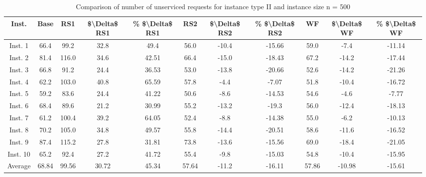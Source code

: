\begin{table}[H]
\centering
\begin{tabular}{ccccccccccc}
  \hline
  \textbf{Inst.} & \textbf{Base} & \textbf{RS1} & \textbf{\$\textbackslash{}Delta\$  RS1} & \textbf{\% \$\textbackslash{}Delta\$  RS1} & \textbf{RS2} & \textbf{\$\textbackslash{}Delta\$  RS2} & \textbf{\% \$\textbackslash{}Delta\$  RS2} & \textbf{WF} & \textbf{\$\textbackslash{}Delta\$  WF} & \textbf{\% \$\textbackslash{}Delta\$  WF} \\\hline
  Inst. 1 & 66.4 & 99.2 & 32.8 & 49.4 & 56.0 & -10.4 & -15.66 & 59.0 & -7.4 & -11.14 \\
  Inst. 2 & 81.4 & 116.0 & 34.6 & 42.51 & 66.4 & -15.0 & -18.43 & 67.2 & -14.2 & -17.44 \\
  Inst. 3 & 66.8 & 91.2 & 24.4 & 36.53 & 53.0 & -13.8 & -20.66 & 52.6 & -14.2 & -21.26 \\
  Inst. 4 & 62.2 & 103.0 & 40.8 & 65.59 & 57.8 & -4.4 & -7.07 & 51.8 & -10.4 & -16.72 \\
  Inst. 5 & 59.2 & 83.6 & 24.4 & 41.22 & 50.6 & -8.6 & -14.53 & 54.6 & -4.6 & -7.77 \\
  Inst. 6 & 68.4 & 89.6 & 21.2 & 30.99 & 55.2 & -13.2 & -19.3 & 56.0 & -12.4 & -18.13 \\
  Inst. 7 & 61.2 & 100.4 & 39.2 & 64.05 & 52.4 & -8.8 & -14.38 & 55.0 & -6.2 & -10.13 \\
  Inst. 8 & 70.2 & 105.0 & 34.8 & 49.57 & 55.8 & -14.4 & -20.51 & 58.6 & -11.6 & -16.52 \\
  Inst. 9 & 87.4 & 115.2 & 27.8 & 31.81 & 73.8 & -13.6 & -15.56 & 69.0 & -18.4 & -21.05 \\
  Inst. 10 & 65.2 & 92.4 & 27.2 & 41.72 & 55.4 & -9.8 & -15.03 & 54.8 & -10.4 & -15.95 \\
  Average & 68.84 & 99.56 & 30.72 & 45.34 & 57.64 & -11.2 & -16.11 & 57.86 & -10.98 & -15.61 \\\hline
\end{tabular}
\caption{Comparison of number of unserviced requests for instance type II and instance size n = 500}
\label{tab:wait:resrelocation-nTaxi-comparison_II_500}
\end{table}
